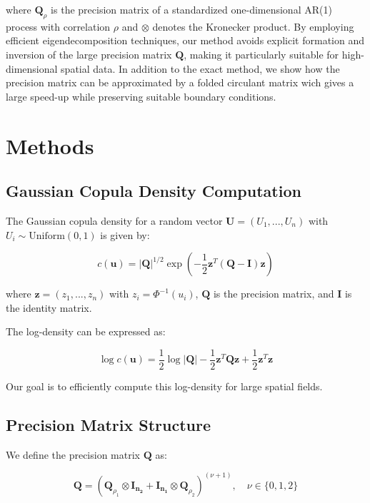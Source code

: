 \documentclass[journal=,manuscript=]{achemso}
\begin{document}
where \(\mathbf{Q}_\rho\) is the precision matrix of a standardized
one-dimensional AR(1) process with correlation \(\rho\) and \(\otimes\)
denotes the Kronecker product. By employing efficient eigendecomposition
techniques, our method avoids explicit formation and inversion of the
large precision matrix \(\mathbf{Q}\), making it particularly suitable
for high-dimensional spatial data. In addition to the exact method, we
show how the precision matrix can be approximated by a folded circulant
matrix wich gives a large speed-up while preserving suitable boundary
conditions.

\section{Methods}\label{methods}

\subsection{Gaussian Copula Density
Computation}\label{gaussian-copula-density-computation}

The Gaussian copula density for a random vector
\(\mathbf{U} = (U_1, ..., U_n)\) with \(U_i \sim \text{Uniform}(0,1)\)
is given by:

\[
c(\mathbf{u}) = |\mathbf{Q}|^{1/2} \exp\left(-\frac{1}{2}\mathbf{z}^T(\mathbf{Q} - \mathbf{I})\mathbf{z}\right)
\]

where \(\mathbf{z} = (z_1, ..., z_n)\) with \(z_i = \Phi^{-1}(u_i)\),
\(\mathbf{Q}\) is the precision matrix, and \(\mathbf{I}\) is the
identity matrix.

The log-density can be expressed as:

\[
\log c(\mathbf{u}) = \frac{1}{2}\log|\mathbf{Q}| - \frac{1}{2}\mathbf{z}^T\mathbf{Q}\mathbf{z} + \frac{1}{2}\mathbf{z}^T\mathbf{z}
\]

Our goal is to efficiently compute this log-density for large spatial
fields.

\subsection{Precision Matrix
Structure}\label{precision-matrix-structure}

We define the precision matrix \(\mathbf{Q}\) as:

\[
\mathbf{Q} = (\mathbf{Q}_{\rho_1} \otimes \mathbf{I_{n_2}} + \mathbf{I_{n_1}} \otimes \mathbf{Q}_{\rho_2})^{(\nu + 1)}, \quad \nu \in \{0, 1, 2\}
\]
\end{document}
